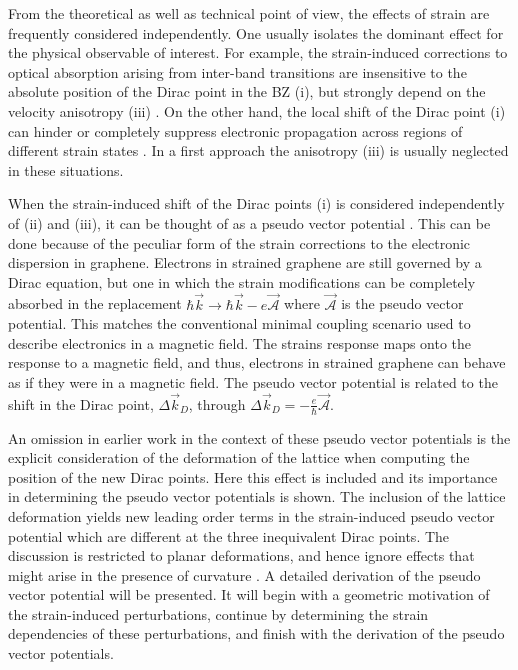 From the theoretical as well as technical point of view, the effects of strain are frequently considered independently.
One usually isolates the dominant effect for the physical observable of interest.
For example, the strain-induced corrections to optical absorption arising from inter-band transitions are insensitive to the absolute position of the Dirac point in the BZ (i), but strongly depend on the velocity anisotropy (iii) \cite{Pereira2010c,Pellegrino2010}.
On the other hand, the local shift of the Dirac point (i) can hinder or completely suppress electronic propagation across regions of different strain states \cite{Pereira2009a,Fogler2008}.
In a first approach the anisotropy (iii) is usually neglected in these situations\cite{Fogler2008,Pereira2009a}.

When the strain-induced shift of the Dirac points (i) is considered independently of (ii) and (iii), it can be thought of as a pseudo vector potential \cite{Sasaki2005,Ando2006,Manes2007,CastroNeto2009,Vozmediano2010}.
This can be done because of the peculiar form of the strain corrections to the electronic dispersion in graphene.
Electrons in strained graphene are still governed by a Dirac equation, but one in which the strain modifications can be completely absorbed in the replacement $\hbar \vec{k} \to \hbar \vec{k}-e \vec{\mathcal{A}}$ where $\vec{\mathcal{A}}$ is the pseudo vector potential.
This matches the conventional minimal coupling scenario used to describe electronics in a magnetic field.
The strains response maps onto the response to a magnetic field, and thus, electrons in strained graphene can behave as if they were in a magnetic field.  
The pseudo vector potential is related to the shift in the Dirac point, $\Delta \vec{k}_D$, through $\Delta \vec{k}_D=-\frac{e}{\hbar} \vec{\mathcal{A}}$.

An omission in earlier work in the context of these pseudo vector potentials is the explicit consideration of the deformation of the lattice when computing the position of the new Dirac points.
Here this effect is included and its importance in determining the pseudo vector potentials is shown.
The inclusion of the lattice deformation yields new leading order terms in the strain-induced pseudo vector potential which are different at the three inequivalent Dirac points.
The discussion is restricted to planar deformations, and hence ignore effects that might arise in the presence of curvature \cite{CastroNeto2009,Vozmediano2010}.
A detailed derivation of the pseudo vector potential will be presented.
It will begin with a geometric motivation of the strain-induced perturbations, continue by determining the strain dependencies of these perturbations, and finish with the derivation of the pseudo vector potentials.

